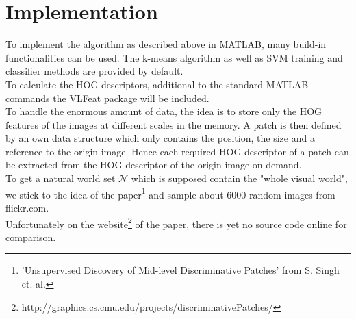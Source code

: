 \section{Implementation}

To implement the algorithm as described above in MATLAB, many build-in functionalities can be used.
The k-means algorithm as well as SVM training and classifier methods are provided by default.\\
To calculate the HOG descriptors, additional to the standard MATLAB commands the VLFeat package will be included.\\

To handle the enormous amount of data, the idea is to store only the HOG features of the images at different scales in the memory. A patch is then defined by an own data structure which only contains the position, the size and a reference to the origin image. Hence each required HOG descriptor of a patch can be extracted from the HOG descriptor of the origin image on demand.\\

To get a natural world set $\mathcal{N}$ which is supposed contain the "whole visual world", we stick to the idea of the paper\footnote{'Unsupervised Discovery of Mid-level Discriminative Patches' from S. Singh et. al.} and sample about 6000 random images from flickr.com.\\

Unfortunately on the website\footnote{http://graphics.cs.cmu.edu/projects/discriminativePatches/} of the paper, there is yet no source code online for comparison.

